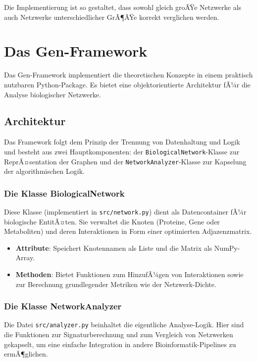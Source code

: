 ﻿\documentclass[a4paper,12pt]{article}
\theoremstyle{definition}
\begin{document}
Die Implementierung ist so gestaltet, dass sowohl gleich groÃŸe Netzwerke als auch Netzwerke unterschiedlicher GrÃ¶ÃŸe korrekt verglichen werden.

\section{Das Gen-Framework}

Das Gen-Framework implementiert die theoretischen Konzepte in einem praktisch nutzbaren Python-Package. Es bietet eine objektorientierte Architektur fÃ¼r die Analyse biologischer Netzwerke.

\subsection{Architektur}

Das Framework folgt dem Prinzip der Trennung von Datenhaltung und Logik und besteht aus zwei Hauptkomponenten: der \texttt{BiologicalNetwork}-Klasse zur ReprÃ¤sentation der Graphen und der \texttt{NetworkAnalyzer}-Klasse zur Kapselung der algorithmischen Logik.

\subsubsection{Die Klasse BiologicalNetwork}

Diese Klasse (implementiert in \texttt{src/network.py}) dient als Datencontainer fÃ¼r biologische EntitÃ¤ten. Sie verwaltet die Knoten (Proteine, Gene oder Metaboliten) und deren Interaktionen in Form einer optimierten Adjazenzmatrix.
\begin{itemize}
	\item \textbf{Attribute}: Speichert Knotennamen als Liste und die Matrix als NumPy-Array.
	\item \textbf{Methoden}: Bietet Funktionen zum HinzufÃ¼gen von Interaktionen sowie zur Berechnung grundlegender Metriken wie der Netzwerk-Dichte.
\end{itemize}

\subsubsection{Die Klasse NetworkAnalyzer}

Die Datei \texttt{src/analyzer.py} beinhaltet die eigentliche Analyse-Logik. Hier sind die Funktionen zur Signaturberechnung und zum Vergleich von Netzwerken gekapselt, um eine einfache Integration in andere Bioinformatik-Pipelines zu ermÃ¶glichen.
\end{document}
